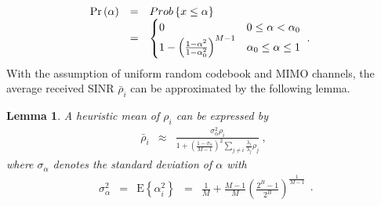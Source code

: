 \documentclass[conference]{IEEEtran}
\newtheorem{lemma}{Lemma}
\begin{document}
\begin{equation}\hspace{-0.10in}
\begin{array}{rcl}
{\rm Pr}\left(\alpha\right)&=&\mbox{Prob}\left\{x\leq\alpha\right\} \\
&=&
\begin{cases}
0 & 0 \leq\alpha < \alpha_{0} \\
1-\left(\frac{1-\alpha^2}{1-\alpha_{0}^2}\right)^{M-1} &
\alpha_{0}\leq\alpha\leq 1
\end{cases}\ .
\end{array}
\end{equation}
\noindent With the assumption of uniform random codebook and MIMO
channels, the average received SINR $\bar\rho_{i}$ can be
approximated by the following lemma.
\begin{lemma} A heuristic mean of $\rho_{i}$
can be expressed by
\begin{equation}%
\begin{array}{rcl}
\bar\rho_{i}&\approx&\frac{\sigma_{\alpha}^{2}\rho_{i}}{1+
\left(\frac{1-\sigma_{\alpha}}{M-1}\right)^{2}\sum\limits_{j\neq
i}\frac{\lambda_{i}}{\lambda_{j}}\rho_{j}}\ ,
\end{array}
\end{equation}
\noindent where $\sigma_{\alpha}$ denotes the standard deviation
of $\alpha$ with
\begin{equation}%
\begin{array}{rcccl}
\sigma_{\alpha}^2&=&\mbox{E}\left\{\alpha_{i}^2\right\}&=&\frac{1}{M}+\frac{M-1}{M}\left(\frac{2^B-1}{2^B}\right)^{\frac{1}{M-1}}
\end{array}.\label{sigma_alpha}
\end{equation}
\end{lemma}
\end{document}
